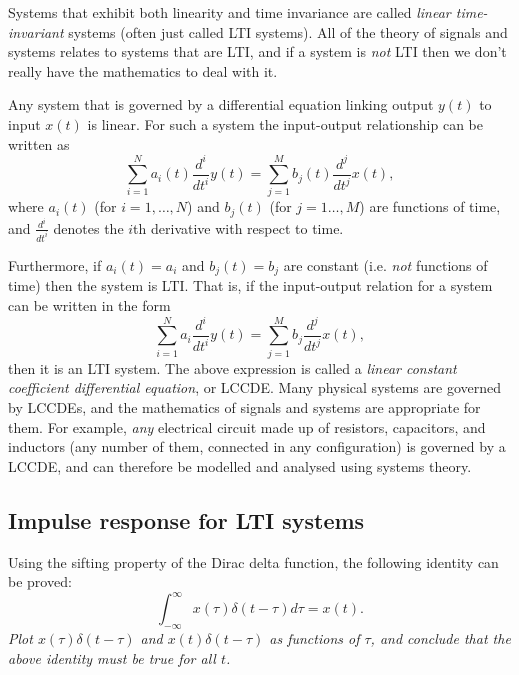 \documentclass[10pt]{beamer}
\begin{document}
Systems that exhibit both linearity and time invariance are called {\em linear time-invariant} systems (often just called LTI systems).  All of the theory of signals and systems relates to systems that are LTI, and if a system is {\em not} LTI then we don't really have the mathematics to deal with it.  

Any system that is governed by a differential equation linking output $y(t)$ to input $x(t)$ is linear.  For such a system the input-output relationship can be written as
\begin{equation*}
  \sum_{i=1}^N a_i(t) \frac{d^i}{dt^i} y(t) = \sum_{j=1}^M b_j(t) \frac{d^j}{dt^j} x(t),
\end{equation*}
where $a_i(t)$ (for $i=1, \ldots, N$) and $b_j(t)$ (for $j = 1\ldots, M$) are functions of time, and $\frac{d^i}{dt^i}$ denotes the $i$th derivative with respect to time.  

Furthermore, if $a_i(t) = a_i$ and $b_j(t) = b_j$ are constant (i.e. {\em not} functions of time) then the system is LTI.  That is, if the input-output relation for a system can be written in the form
\begin{equation*}
  \sum_{i=1}^N a_i \frac{d^i}{dt^i} y(t) = \sum_{j=1}^M b_j \frac{d^j}{dt^j} x(t),
\end{equation*}
then it is an LTI system.  The above expression is called a {\em linear constant coefficient differential equation}, or LCCDE.  Many physical systems are governed by LCCDEs, and the mathematics of signals and systems are appropriate for them.  For example, {\em any} electrical circuit made up of resistors, capacitors, and inductors (any number of them, connected in any configuration) is governed by a LCCDE, and can therefore be modelled and analysed using systems theory.

\subsection{Impulse response for LTI systems}

Using the sifting property of the Dirac delta function, the following identity can be proved:
\begin{equation*}
  \int_{-\infty}^\infty x(\tau) \delta(t - \tau) d\tau = x(t).
\end{equation*}
{\em Plot $x(\tau) \delta(t - \tau)$ and $x(t) \delta(t - \tau)$ as functions of $\tau$, and conclude that the above identity must be true for all $t$.}
\end{document}
